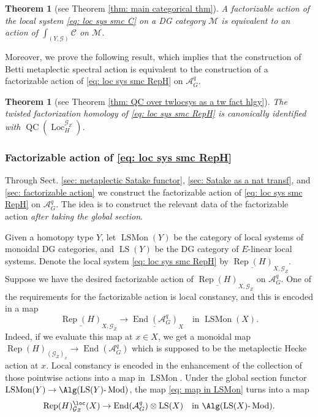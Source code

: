 \documentclass[10pt]{amsart}
\newcommand{\sssec}{\subsubsection}
\newtheorem{thm}[subsubsection]{Theorem}
\theoremstyle{remark}
\newcommand{\te}{\text}
\newcommand{\ul}{\underline}
\newcommand{\on}{\operatorname}
\newcommand{\cA}{\mathcal{A}}
\newcommand{\cC}{\mathcal{C}}
\newcommand{\cG}{\mathcal{G}}
\newcommand{\cM}{\mathcal{M}}
\newcommand{\LSMon}{\on{LSMon}}
\newcommand{\lMod}{\text{-}\on{Mod}}
\newcommand{\Rep}{\on{Rep}}
\newcommand{\QC}{\on{QC}}
\newcommand{\Loc}{\on{Loc}}
\newcommand{\LS}{\on{LS}}
\DeclareMathOperator{\End}{End}
\begin{document}
\begin{thm}[see Theorem \ref{thm: main categorical thm}]
    A factorizable action of the local system \eqref{eq: loc sys smc C} on a DG category $\cM$ is equivalent to an action of $\int_{(Y,\cG)}\cC$ on $\cM$.
\end{thm}

Moreover, we prove the following result, which implies that the construction of Betti metaplectic spectral action is equivalent to the construction of a factorizable action of \eqref{eq: loc sys smc RepH} on $\cA^q_G$.

\begin{thm}[see Theorem \ref{thm: QC over twlocsys as a tw fact hlgy}]
    The twisted factorization homology of \eqref{eq: loc sys smc RepH} is canonically identified with $\QC(\Loc^{\cG_Z}_H)$.
\end{thm}

\sssec{Factorizable action of \eqref{eq: loc sys smc RepH}}
Through Sect. \ref{sec: metaplectic Satake functor}, \ref{sec: Satake as a nat transf}, and \ref{sec: factorizable action} we construct the factorizable action of \eqref{eq: loc sys smc RepH} on $\cA^q_G$. The idea is to construct the relevant data of the factorizable action \emph{after taking the global section}.
\medskip

Given a homotopy type $Y$, let $\LSMon(Y)$ be the category of local systems of monoidal DG categories, and $\LS(Y)$ be the DG category of $E$-linear local systems.
Denote the local system \eqref{eq: loc sys smc RepH} by $\ul{\Rep(H)}_{X,\cG_Z}$. Suppose we have the desired factorizable action of $\ul{\Rep(H)}_{X,\cG_Z}$ on $\cA^q_G$. One of the requirements for the factorizable action is local constancy, and this is encoded in a map
\begin{equation}\label{eq: map in LSMon}
    \ul{\Rep(H)}_{X,\cG_Z}\rightarrow \ul{\End(\cA^q_G)}_X\quad \te{in }\LSMon(X).
\end{equation}
Indeed, if we evaluate this map at $x\in X$, we get a monoidal map $\Rep(H)_{(\cG_Z)_x}\rightarrow \End(\cA^q_G)$ which is supposed to be the metaplectic Hecke action at $x$. Local constancy is encoded in the enhancement of the collection of those pointwise actions into a map in $\LSMon$. Under the global section functor $\LSMon(Y)\rightarrow \Alg(\LS(Y)\lMod)$, the map \eqref{eq: map in LSMon} turns into a map
\begin{equation}\label{eq: map in Alg LS Mod}
    \Rep(H)^{\loc}_{\cG_Z}(X)\rightarrow \End(\cA^q_G)\otimes\LS(X)\quad \te{in }\Alg(\LS(X)\lMod).
\end{equation}
\end{document}
